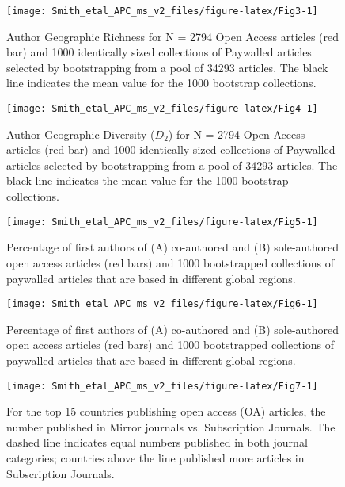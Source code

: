 \documentclass[
  english,
  man]{apa6}
\begin{document}
\begin{figure}

{\centering \texttt{[image: Smith\_etal\_APC\_ms\_v2\_files/figure-latex/Fig3-1]} 

}

\caption{Author Geographic Richness for N =  2794  Open Access articles (red bar) and 1000 identically sized collections of Paywalled articles selected by bootstrapping from a pool of  34293  articles. The black line indicates the mean value for the 1000 bootstrap collections.}\label{fig:Fig3}
\end{figure}

\begin{figure}

{\centering \texttt{[image: Smith\_etal\_APC\_ms\_v2\_files/figure-latex/Fig4-1]} 

}

\caption{Author Geographic Diversity ($D_2$) for N =  2794  Open Access articles (red bar) and 1000 identically sized collections of Paywalled articles selected by bootstrapping from a pool of  34293  articles.  The black line indicates the mean value for the 1000 bootstrap collections.}\label{fig:Fig4}
\end{figure}

\begin{figure}

{\centering \texttt{[image: Smith\_etal\_APC\_ms\_v2\_files/figure-latex/Fig5-1]} 

}

\caption{Percentage of first authors of (A) co-authored and (B) sole-authored open access articles (red bars) and 1000 bootstrapped collections of paywalled articles that are based in different global regions.}\label{fig:Fig5}
\end{figure}

\begin{figure}

{\centering \texttt{[image: Smith\_etal\_APC\_ms\_v2\_files/figure-latex/Fig6-1]} 

}

\caption{Percentage of first authors of (A) co-authored and (B) sole-authored open access articles (red bars) and 1000 bootstrapped collections of paywalled articles that are based in different global regions.}\label{fig:Fig6}
\end{figure}

\begin{figure}

{\centering \texttt{[image: Smith\_etal\_APC\_ms\_v2\_files/figure-latex/Fig7-1]} 

}

\caption{For the top 15 countries publishing open access (OA) articles, the number published in Mirror journals vs. Subscription Journals. The dashed line indicates equal numbers published in both journal categories; countries above the line published more articles in Subscription Journals.}\label{fig:Fig7}
\end{figure}
\end{document}
